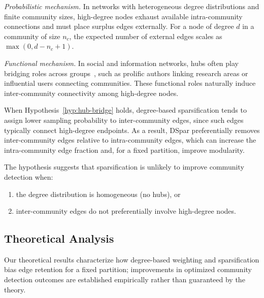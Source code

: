 \documentclass[10pt,journal,compsoc]{IEEEtran}
\begin{document}
\textit{Probabilistic mechanism.}
In networks with heterogeneous degree distributions and finite community
sizes, high-degree nodes exhaust available intra-community connections and
must place surplus edges externally. For a node of degree $d$ in a community
of size $n_c$, the expected number of external edges scales as
$\max(0, d-n_c+1)$.

\textit{Functional mechanism.}
In social and information networks, hubs often play bridging roles across
groups~\cite{granovetter1973strength,newman2001structure}, such as prolific
authors linking research areas or influential users connecting communities.
These functional roles naturally induce inter-community connectivity among
high-degree nodes.

When Hypothesis~\ref{hyp:hub-bridge} holds, degree-based sparsification tends
to assign lower sampling probability to inter-community edges, since such
edges typically connect high-degree endpoints. As a result, DSpar
preferentially removes inter-community edges relative to intra-community
edges, which can increase the intra-community edge fraction and, for a fixed
partition, improve modularity.

The hypothesis suggests that sparsification is unlikely to improve community
detection when:
\begin{enumerate}
    \item the degree distribution is homogeneous (no hubs), or
    \item inter-community edges do not preferentially involve high-degree nodes.
\end{enumerate}

\subsection{Theoretical Analysis}

Our theoretical results characterize how degree-based weighting and sparsification bias edge retention for a fixed partition; improvements in optimized community detection outcomes are established empirically rather than guaranteed by the theory.
\end{document}
